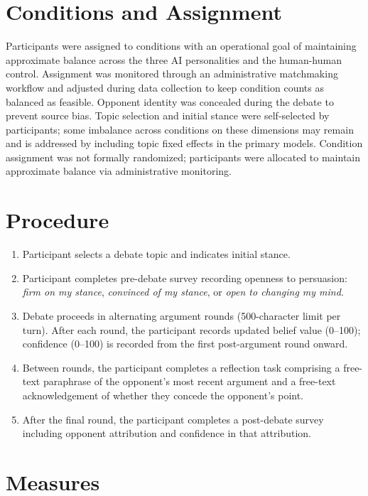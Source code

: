 \section{Conditions and Assignment}

Participants were assigned to conditions with an operational goal of maintaining
approximate balance across the three AI personalities and the human-human control.
Assignment was monitored through an administrative matchmaking workflow and adjusted
during data collection to keep condition counts as balanced as feasible. Opponent
identity was concealed during the debate to prevent source bias. Topic selection
and initial stance were self-selected by participants; some imbalance across
conditions on these dimensions may remain and is addressed by including topic
fixed effects in the primary models.
Condition assignment was not formally randomized; participants were allocated to
maintain approximate balance via administrative monitoring.


\section{Procedure}

\begin{enumerate}
      \item Participant selects a debate topic and indicates initial stance.
    \item Participant completes pre-debate survey recording openness to persuasion:
          \textit{firm on my stance}, \textit{convinced of my stance}, or
          \textit{open to changing my mind}.
    \item Debate proceeds in alternating argument rounds (500-character limit per
          turn). After each round, the participant records updated belief value
          (0--100); confidence (0--100) is recorded from the first post-argument
          round onward.
    \item Between rounds, the participant completes a reflection task comprising
          a free-text paraphrase of the opponent's most recent argument and a
          free-text acknowledgement of whether they concede the opponent's point.
    \item After the final round, the participant completes a post-debate survey
          including opponent attribution and confidence in that attribution.
\end{enumerate}

\pagebreak
\section{Measures}


